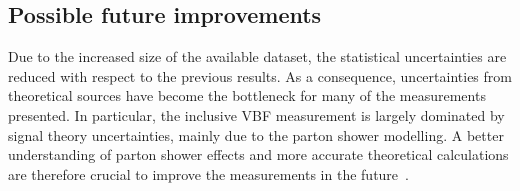 
\subsection{Possible future improvements}
Due to the increased size of the available dataset, the statistical uncertainties are reduced with respect to the previous results.
As a consequence, uncertainties from theoretical sources have become the bottleneck for many of the measurements presented.
In particular, the inclusive VBF measurement is largely dominated by signal theory uncertainties, mainly due to the parton shower modelling.
A better understanding of parton shower effects and more accurate theoretical calculations are therefore crucial to improve the measurements in the future~\cite{Jger2020}. 

